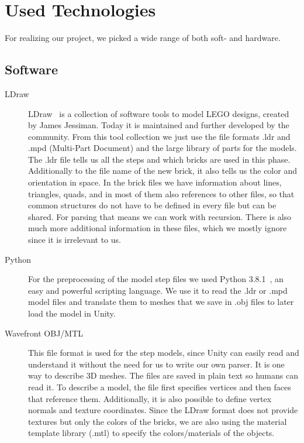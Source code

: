\section{Used Technologies}

For realizing our project, we picked a wide range of both soft- and hardware.

\subsection{Software}

\begin{description}
	\item[LDraw]
	
	LDraw~\cite{ldraw} is a collection of software tools to model LEGO designs, created by James Jessiman. Today it is maintained and further developed by the community. From this tool collection we just use the file formats .ldr and .mpd (Multi-Part Document) and the large library of parts for the models. The .ldr file tells us all the steps and which bricks are used in this phase. Additionally to the file name of the new brick, it also tells us the color and orientation in space. In the brick files we have information about lines, triangles, quads, and in most of them also references to other files, so that common structures do not have to be defined in every file but can be shared. For parsing that means we can work with recursion. There is also much more additional information in these files, which we mostly ignore since it is irrelevant to us.
	
	\item[Python]
	
	For the preprocessing of the model step files we used Python 3.8.1~\cite{python}, an easy and powerful scripting language. We use it to read the .ldr or .mpd model files and translate them to meshes that we save in .obj files to later load the model in Unity. 
	
	\item[Wavefront OBJ/MTL]
	
	This file format is used for the step models, since Unity can easily read and understand it without the need for us to write our own parser. It is one way to describe 3D meshes. The files are saved in plain text so humans can read it. To describe a model, the file first specifies vertices and then faces that reference them. Additionally, it is also possible to define vertex normals and texture coordinates. Since the LDraw format does not provide textures but only the colors of the bricks, we are also using the material template library (.mtl) to specify the colors/materials of the objects.
	

\end{description}
